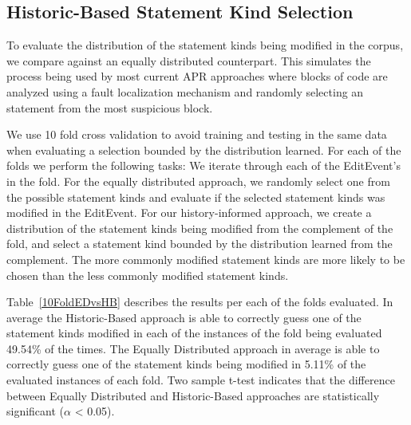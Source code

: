 \documentclass[sigconf]{acmart}
\begin{document}
\subsection{Historic-Based Statement Kind Selection}
To evaluate the distribution of the statement kinds being modified
in the corpus, we compare against an equally distributed counterpart.
This simulates the process being used by most current APR approaches
where blocks of code are analyzed using a fault localization 
mechanism and randomly selecting an statement from the most
suspicious block.

We use 10 fold
cross validation to avoid training and testing in the same data
when evaluating a selection bounded by the distribution
learned. For each of the folds we perform the following
tasks:
We iterate through each of the EditEvent's in the fold. For
the equally distributed approach, we randomly select one from 
the possible statement kinds and evaluate if the selected
statement kinds was modified in the EditEvent.
For our history-informed approach, we create a distribution
of the statement kinds being modified from the complement of the fold, 
and select a statement
kind bounded by the distribution 
learned from the complement. The more commonly modified statement
kinds are more likely to be chosen than the less commonly modified
statement kinds.

Table~\ref{10FoldEDvsHB} describes the results per each of the folds evaluated.
In average 
the Historic-Based approach is able to correctly guess one of  the statement kinds modified
in each of the instances of the fold being evaluated 49.54\% of the times. The Equally Distributed approach
in average is able to correctly guess one of the statement kinds being modified in 5.11\% 
of the evaluated instances of each fold.
Two sample t-test indicates that the difference between Equally Distributed and Historic-Based approaches are statistically significant ($\alpha$ < 0.05).
\end{document}
